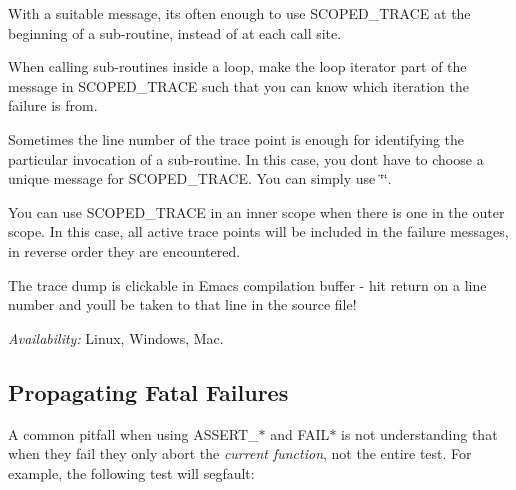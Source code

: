 \begin{DoxyEnumerate}
\item With a suitable message, it\textquotesingle{}s often enough to use {\ttfamily S\+C\+O\+P\+E\+D\+\_\+\+T\+R\+A\+CE} at the beginning of a sub-\/routine, instead of at each call site.
\end{DoxyEnumerate}
\begin{DoxyEnumerate}
\item When calling sub-\/routines inside a loop, make the loop iterator part of the message in {\ttfamily S\+C\+O\+P\+E\+D\+\_\+\+T\+R\+A\+CE} such that you can know which iteration the failure is from.
\end{DoxyEnumerate}
\begin{DoxyEnumerate}
\item Sometimes the line number of the trace point is enough for identifying the particular invocation of a sub-\/routine. In this case, you don\textquotesingle{}t have to choose a unique message for {\ttfamily S\+C\+O\+P\+E\+D\+\_\+\+T\+R\+A\+CE}. You can simply use {\ttfamily \char`\"{}\char`\"{}}.
\end{DoxyEnumerate}
\begin{DoxyEnumerate}
\item You can use {\ttfamily S\+C\+O\+P\+E\+D\+\_\+\+T\+R\+A\+CE} in an inner scope when there is one in the outer scope. In this case, all active trace points will be included in the failure messages, in reverse order they are encountered.
\end{DoxyEnumerate}
\begin{DoxyEnumerate}
\item The trace dump is clickable in Emacs\textquotesingle{} compilation buffer -\/ hit return on a line number and you\textquotesingle{}ll be taken to that line in the source file!
\end{DoxyEnumerate}

{\itshape Availability\+:} Linux, Windows, Mac.

\subsection*{Propagating Fatal Failures}

A common pitfall when using {\ttfamily A\+S\+S\+E\+R\+T\+\_\+$\ast$} and {\ttfamily F\+A\+I\+L$\ast$} is not understanding that when they fail they only abort the {\itshape current function}, not the entire test. For example, the following test will segfault\+: 
\begin{DoxyCode}{0}
\DoxyCodeLine{\}}
\DoxyCodeLine{}
\DoxyCodeLine{\}}
\end{DoxyCode}


